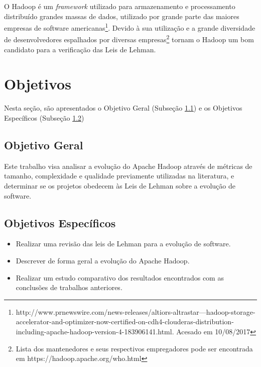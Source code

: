 O Hadoop é um \textit{framework} utilizado para armazenamento e processamento distribuído grandes massas de dados, utilizado por grande parte das maiores empresas de software americanas\footnote{http://www.prnewswire.com/news-releases/altiors-altrastar---hadoop-storage-accelerator-and-optimizer-now-certified-on-cdh4-clouderas-distribution-including-apache-hadoop-version-4-183906141.html. Acesado em 10/08/2017}. Devido à sua utilização e a grande diversidade de desenvolvedores espalhados por diversas empresas\footnote{Lista dos mantenedores e seus respectivos empregadores pode ser encontrada em https://hadoop.apache.org/who.html} tornam o Hadoop um bom candidato para a verificação das Leis de Lehman. %

\section{Objetivos}

Nesta seção, são apresentados o Objetivo Geral (Subseção \ref{ssec:num1}) e os Objetivos Específicos (Subseção \ref{ssec:num2})
\subsection{Objetivo Geral} \label{ssec:num1}
Este trabalho visa analisar a evolução do Apache Hadoop através de métricas de tamanho, complexidade e qualidade previamente utilizadas na literatura\cite{israeli2010linux,lehman1979understanding, mccabe1976complexity}, e determinar se os projetos obedecem às Leis de Lehman sobre a evolução de software.

\subsection{Objetivos Específicos} \label{ssec:num2}
\begin{itemize}
\item Realizar uma revisão das leis de Lehman para a evolução de software.
\item Descrever de forma geral a evolução do Apache Hadoop.
\item Realizar um estudo comparativo dos resultados encontrados com as conclusões de trabalhos anteriores.
\end{itemize}


